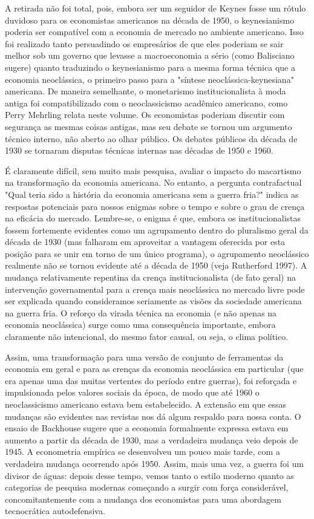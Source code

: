 \documentclass[12pt]{article}
\begin{document}
A retirada não foi total, pois, embora ser um seguidor de Keynes fosse um rótulo duvidoso para os economistas americanos na década de 1950, o keynesianismo poderia ser compatível com a economia de mercado no ambiente americano. Isso foi realizado tanto persuadindo os empresários de que eles poderiam se sair melhor sob um governo que levasse a macroeconomia a sério (como Balisciano sugere) quanto traduzindo o keynesianismo para a mesma forma técnica que a economia neoclássica, o primeiro passo para a "síntese neoclássica-keynesiana" americana. De maneira semelhante, o monetarismo institucionalista à moda antiga foi compatibilizado com o neoclassicismo acadêmico americano, como Perry Mehrling relata neste volume. Os economistas poderiam discutir com segurança as mesmas coisas antigas, mas seu debate se tornou um argumento técnico interno, não aberto ao olhar público. Os debates públicos da década de 1930 se tornaram disputas técnicas internas nas décadas de 1950 e 1960.

É claramente difícil, sem muito mais pesquisa, avaliar o impacto do macartismo na transformação da economia americana. No entanto, a pergunta contrafactual "Qual teria sido a história da economia americana sem a guerra fria?" indica as respostas potenciais para nossos enigmas sobre o tempo e sobre o grau de crença na eficácia do mercado. Lembre-se, o enigma é que, embora os institucionalistas fossem fortemente evidentes como um agrupamento dentro do pluralismo geral da década de 1930 (mas falharam em aproveitar a vantagem oferecida por esta posição para se unir em torno de um único programa), o agrupamento neoclássico realmente não se tornou evidente até a década de 1950 (veja Rutherford 1997). A mudança relativamente repentina da crença institucionalista (de fato geral) na intervenção governamental para a crença mais neoclássica no mercado livre pode ser explicada quando consideramos seriamente as visões da sociedade americana na guerra fria. O reforço da virada técnica na economia (e não apenas na economia neoclássica) surge como uma consequência importante, embora claramente não intencional, do mesmo fator causal, ou seja, o clima político.

Assim, uma transformação para uma versão de conjunto de ferramentas da economia em geral e para as crenças da economia neoclássica em particular (que era apenas uma das muitas vertentes do período entre guerras), foi reforçada e impulsionada pelos valores sociais da época, de modo que até 1960 o neoclassicismo americano estava bem estabelecido. A extensão em que essas mudanças são evidentes nas revistas nos dá algum respaldo para nossa conta. O ensaio de Backhouse sugere que a economia formalmente expressa estava em aumento a partir da década de 1930, mas a verdadeira mudança veio depois de 1945. A econometria empírica se desenvolveu um pouco mais tarde, com a verdadeira mudança ocorrendo após 1950. Assim, mais uma vez, a guerra foi um divisor de águas: depois desse tempo, vemos tanto o estilo moderno quanto as categorias de pesquisa modernas começando a surgir com força considerável, concomitantemente com a mudança dos economistas para uma abordagem tecnocrática autodefensiva.
\end{document}

